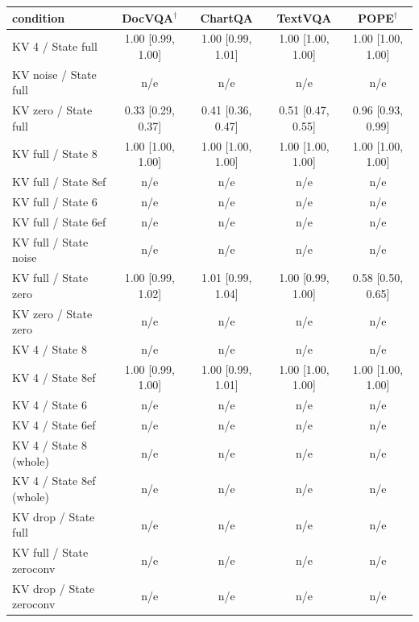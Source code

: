 \begin{tabular}{lcccc}
\toprule
condition & DocVQA$^\dagger$ & ChartQA & TextVQA & POPE$^\dagger$ \\
\midrule
KV 4 / State full & 1.00 {\scriptsize[0.99, 1.00]} & 1.00 {\scriptsize[0.99, 1.01]} & 1.00 {\scriptsize[1.00, 1.00]} & 1.00 {\scriptsize[1.00, 1.00]} \\
KV noise / State full & n/e & n/e & n/e & n/e \\
KV zero / State full & 0.33 {\scriptsize[0.29, 0.37]} & 0.41 {\scriptsize[0.36, 0.47]} & 0.51 {\scriptsize[0.47, 0.55]} & 0.96 {\scriptsize[0.93, 0.99]} \\
KV full / State 8 & 1.00 {\scriptsize[1.00, 1.00]} & 1.00 {\scriptsize[1.00, 1.00]} & 1.00 {\scriptsize[1.00, 1.00]} & 1.00 {\scriptsize[1.00, 1.00]} \\
KV full / State 8ef & n/e & n/e & n/e & n/e \\
KV full / State 6 & n/e & n/e & n/e & n/e \\
KV full / State 6ef & n/e & n/e & n/e & n/e \\
KV full / State noise & n/e & n/e & n/e & n/e \\
KV full / State zero & 1.00 {\scriptsize[0.99, 1.02]} & 1.01 {\scriptsize[0.99, 1.04]} & 1.00 {\scriptsize[0.99, 1.00]} & 0.58 {\scriptsize[0.50, 0.65]} \\
KV zero / State zero & n/e & n/e & n/e & n/e \\
KV 4 / State 8 & n/e & n/e & n/e & n/e \\
KV 4 / State 8ef & 1.00 {\scriptsize[0.99, 1.00]} & 1.00 {\scriptsize[0.99, 1.01]} & 1.00 {\scriptsize[1.00, 1.00]} & 1.00 {\scriptsize[1.00, 1.00]} \\
KV 4 / State 6 & n/e & n/e & n/e & n/e \\
KV 4 / State 6ef & n/e & n/e & n/e & n/e \\
KV 4 / State 8 (whole) & n/e & n/e & n/e & n/e \\
KV 4 / State 8ef (whole) & n/e & n/e & n/e & n/e \\
KV drop / State full & n/e & n/e & n/e & n/e \\
KV full / State zeroconv & n/e & n/e & n/e & n/e \\
KV drop / State zeroconv & n/e & n/e & n/e & n/e \\
\bottomrule
\end{tabular}
